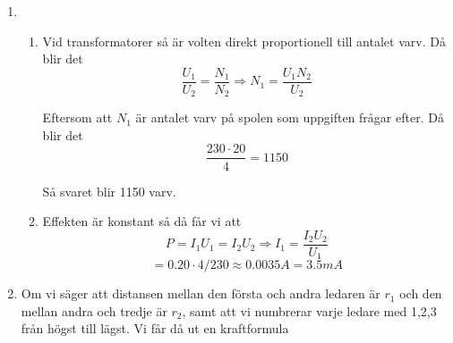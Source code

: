 \documentclass[a4paper,12pt]{article}
\begin{document}
\begin{enumerate}
      \item
            \begin{enumerate}
                  \item
                        Vid transformatorer så är volten direkt proportionell till antalet varv.
                        Då blir det $$\frac{U_1}{U_2}=\frac{N_1}{N_2}\Rightarrow N_1=\frac{U_1N_2}{U_2}$$

                        Eftersom att $N_1$ är antalet varv på spolen som uppgiften frågar efter.
                        Då blir det
                        $$\frac{230\cdot 20}{4}=1150$$

                        Så svaret blir 1150 varv.
                  \item Effekten är konstant så då får vi att $$P=I_1U_1=I_2U_2\Rightarrow I_1=\frac{I_2U_2}{U_1}$$
                        $$=0.20\cdot 4 / 230 \approx 0.0035A=3.5mA$$
            \end{enumerate}

      \item Om vi säger att distansen mellan den första och andra ledaren är $r_1$ och
            den mellan andra och tredje är $r_2$, samt att vi numbrerar varje ledare
            med 1,2,3 från högst till lägst. Vi får då ut en kraftformula


\end{enumerate}
\end{document}
